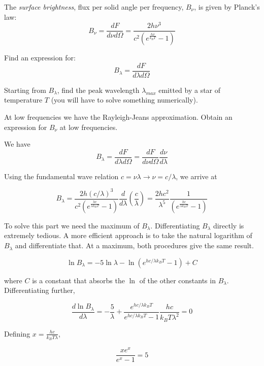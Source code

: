 \documentclass[11pt]{article}
\begin{document}
\begin{pproblem}
    The \textit{surface brightness}, flux per solid angle per frequency, \(B_\nu\), is given by Planck's law:
    \[B_\nu = \frac{dF}{d\nu d\Omega} = \frac{2h\nu^3}{c^2(e^{\frac{h\nu}{k_BT}}-1)}\] 
    \begin{alternativas}
        \item Find an expression for:
        \[B_\lambda = \frac{dF}{d\lambda d\Omega}\]
        \item Starting from \(B_\lambda\), find the peak wavelength \(\lambda_{max}\) emitted by a star of temperature \(T\) (you will have to solve something numerically).
        \item At low frequencies we have the Rayleigh-Jeans approximation. Obtain an expression for \(B_\nu\) at low frequencies.
        \end{alternativas}

\begin{pssolution*}{}{}
    \begin{alternativas}
        \item We have
        \[B_\lambda = \frac{dF}{d\lambda d\Omega} = \frac{dF}{d\nu d\Omega}\frac{d\nu}{d\lambda}\]

        Using the fundamental wave relation \(c=\nu\lambda \rightarrow \nu = c/\lambda\), we arrive at

        \[B_\lambda = \frac{2h(c/\lambda)^3}{c^2(e^{\frac{hc}{\lambda k_BT}}-1)}\frac{d}{d\lambda}\left(\frac{c}{\lambda}\right) = \frac{2hc^2}{\lambda^5}\frac{1}{(e^{\frac{hc}{\lambda k_BT}}-1)}\]

        \item To solve this part we need the maximum of \(B_\lambda\). Differentiating \(B_\lambda\) directly is extremely tedious. A more efficient approach is to take the natural logarithm of \(B_\lambda\) and differentiate that. At a maximum, both procedures give the same result.
        
        \[\ln B_\lambda = -5\ln \lambda - \ln (e^{hc/\lambda k_BT}-1) + C\]

        where \(C\) is a constant that absorbs the \(\ln\) of the other constants in \(B_\lambda\). Differentiating further,

        \[\frac{d \ln B_\lambda}{d\lambda} = -\frac{5}{\lambda} + \frac{e^{hc/\lambda k_BT}}{e^{hc/\lambda k_BT}-1}\frac{hc}{k_BT\lambda^2}=0\]

        Defining \(x = \frac{hc}{k_BT\lambda}\),

        \[\frac{xe^x}{e^x-1}=5\]


\end{alternativas}
\end{pssolution*}
\end{pproblem}
\end{document}
